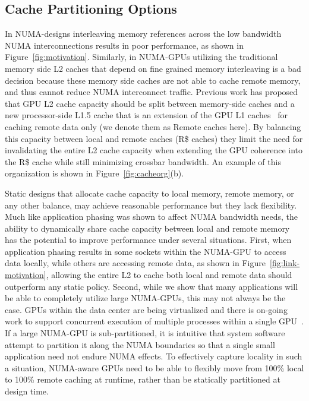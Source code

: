 \subsection{Cache Partitioning Options}
In NUMA-designs interleaving memory references across the low bandwidth NUMA 
interconnections results in poor performance, as shown in 
Figure~\ref{fig:motivation}. Similarly, in NUMA-GPUs utilizing the 
traditional memory side L2 caches that depend on fine grained memory 
interleaving is a bad decision because these memory side caches are not able 
to cache remote memory, and thus cannot reduce NUMA interconnect traffic.  
Previous work has proposed that GPU L2 cache capacity should be split between 
memory-side caches and a new processor-side L1.5 cache that is an extension 
of the GPU L1 caches~\cite{Arunkumar2017} for caching remote data only (we 
denote them as Remote caches here). By balancing this capacity between local 
and remote caches (R\$ caches) they limit the need for invalidating the entire 
L2 cache capacity when extending the GPU coherence into the R\$ cache while still 
minimizing crossbar bandwidth. An example of this organization is shown in 
Figure~\ref{fig:cacheorg}(b). 

Static designs that allocate cache capacity to local memory, remote memory, 
or any other balance, may achieve reasonable performance but they lack 
flexibility. Much like application phasing was shown to affect NUMA bandwidth 
needs, the ability to dynamically share cache capacity between local and 
remote memory has the potential to improve performance under several 
situations. First, when application phasing results in some sockets within 
the NUMA-GPU to access data locally, while others are accessing remote data, 
as shown in Figure~\ref{fig:link-motivation}, allowing the entire L2 to cache 
both local and remote data should outperform any static policy. Second, while 
we show that many applications will be able to completely utilize large 
NUMA-GPUs, this may not always be the case. GPUs within the data center are 
being virtualized and there is on-going work to support concurrent execution 
of multiple processes within a single GPU~\cite{park2015chimera, 
lin2016enabling}. If a large NUMA-GPU is sub-partitioned, it is intuitive 
that system software attempt to partition it along the NUMA boundaries so 
that a single small application need not endure NUMA effects. To effectively 
capture locality in such a situation, NUMA-aware GPUs need to be able to 
flexibly move from 100\% local to 100\% remote caching at runtime, rather 
than be statically partitioned at design time. 


